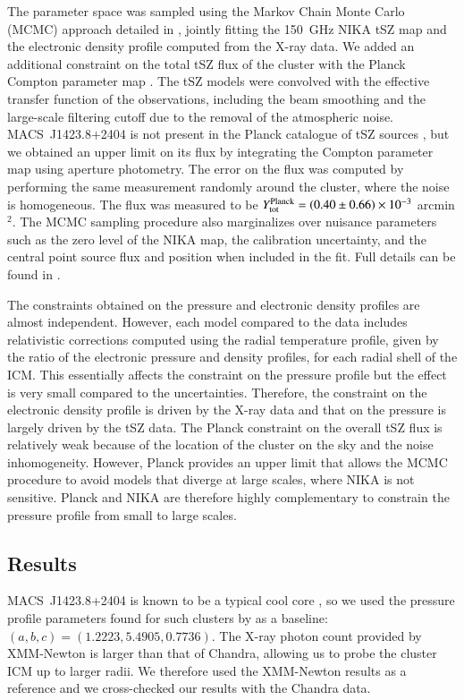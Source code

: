 \documentclass[traditabstract]{aa}
\begin{document}
The parameter space was sampled using the Markov Chain Monte Carlo (MCMC) approach detailed in \cite{adam2014}, jointly fitting the 150~GHz NIKA tSZ map and the electronic density profile computed from the X-ray data. We added an additional constraint on the total tSZ flux of the cluster with the Planck Compton parameter map \citep{planck2015XXII}. The tSZ models were convolved with the effective transfer function of the observations, including the beam smoothing and the large-scale filtering cutoff due to the removal of the atmospheric noise. \mbox{MACS~J1423.8+2404} is not present in the Planck catalogue of tSZ sources \citep{planck2015XXVII}, but we obtained an upper limit on its flux by integrating the Compton parameter map \citep{planck2015XXII} using aperture photometry. The error on the flux was computed by performing the same measurement randomly around the cluster, where the noise is homogeneous. The flux was measured to be $Y_{\rm tot}^{\rm Planck} = \left(0.40 \pm 0.66\right) \times 10^{-3}$ arcmin$^2$. The MCMC sampling procedure also marginalizes over nuisance parameters such as the zero level of the NIKA map, the calibration uncertainty, and the central point source flux and position when included in the fit. Full details can be found in \cite{adam2014}.

The constraints obtained on the pressure and electronic density profiles are almost independent. However, each model compared to the data includes relativistic corrections computed using the radial temperature profile, given by the ratio of the electronic pressure and density profiles, for each radial shell of the ICM. This  essentially affects the constraint on the pressure profile but the effect is very small compared to the uncertainties. Therefore, the constraint on the electronic density profile is driven by the X-ray data and that on the pressure is largely driven by the tSZ data. The Planck constraint on the overall tSZ flux is relatively weak because of the location of the cluster on the sky and the noise inhomogeneity. However, Planck provides an upper limit that allows the MCMC procedure to avoid models that diverge at large scales, where NIKA is not sensitive. Planck and NIKA are therefore highly complementary to constrain the pressure profile from small to large scales.

\subsection{Results}\label{sec:results}
\mbox{MACS~J1423.8+2404} is known to be a typical cool core \citep[e.g.,][]{morandi2010}, so we used the pressure profile parameters found for such clusters by \cite{arnaud2010} as a baseline: $\left(a,b,c\right) = \left(1.2223, 5.4905, 0.7736\right)$. The X-ray photon count provided by XMM-Newton is larger than that of Chandra, allowing us to probe the cluster ICM up to larger radii. We therefore used the XMM-Newton results as a reference and we cross-checked our results with the Chandra data.
\end{document}
